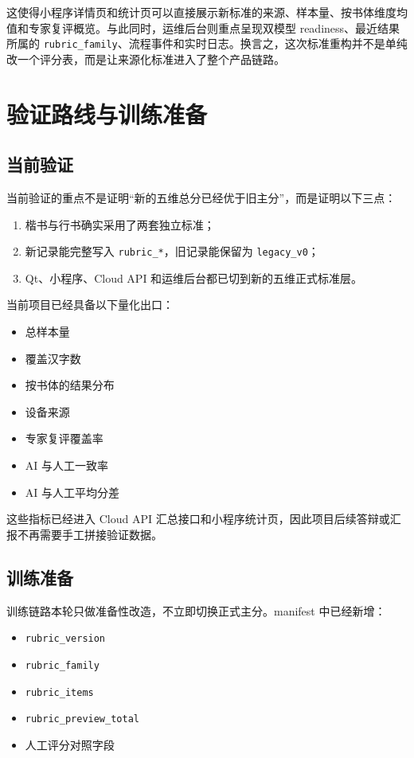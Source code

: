\documentclass[UTF8,a4paper,12pt,fontset=none]{ctexart}
\begin{document}
这使得小程序详情页和统计页可以直接展示新标准的来源、样本量、按书体维度均值和专家复评概览。与此同时，运维后台则重点呈现双模型 readiness、最近结果所属的 \texttt{rubric\_family}、流程事件和实时日志。换言之，这次标准重构并不是单纯改一个评分表，而是让来源化标准进入了整个产品链路。

\section{验证路线与训练准备}
\subsection{当前验证}
当前验证的重点不是证明“新的五维总分已经优于旧主分”，而是证明以下三点：

\begin{enumerate}
  \item 楷书与行书确实采用了两套独立标准；
  \item 新记录能完整写入 \texttt{rubric\_*}，旧记录能保留为 \texttt{legacy\_v0}；
  \item Qt、小程序、Cloud API 和运维后台都已切到新的五维正式标准层。
\end{enumerate}

当前项目已经具备以下量化出口：

\begin{itemize}
  \item 总样本量
  \item 覆盖汉字数
  \item 按书体的结果分布
  \item 设备来源
  \item 专家复评覆盖率
  \item AI 与人工一致率
  \item AI 与人工平均分差
\end{itemize}

这些指标已经进入 Cloud API 汇总接口和小程序统计页，因此项目后续答辩或汇报不再需要手工拼接验证数据。

\subsection{训练准备}
训练链路本轮只做准备性改造，不立即切换正式主分。manifest 中已经新增：

\begin{itemize}
  \item \texttt{rubric\_version}
  \item \texttt{rubric\_family}
  \item \texttt{rubric\_items}
  \item \texttt{rubric\_preview\_total}
  \item 人工评分对照字段
\end{itemize}
\end{document}
